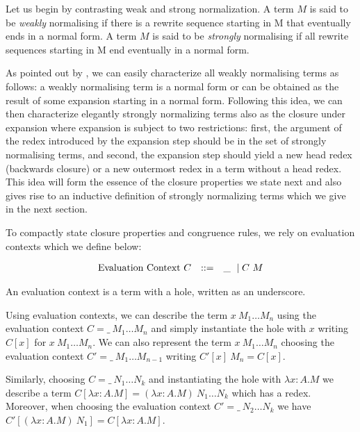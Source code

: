 \documentclass{article}
\begin{document}

Let us begin by contrasting weak and strong normalization. A term $M$ is said to be \emph{weakly} normalising if there is a  rewrite sequence starting in M that eventually ends in a  normal form. A  term $M$ is said to be \emph{strongly} normalising if all rewrite sequences starting in M end eventually in a  normal form.

As pointed out by \cite{Raamsdonk_onnormalisation}, we can easily characterize all weakly normalising terms as follows: a  weakly normalising term is a normal form or can be obtained as the result of some expansion starting in a  normal form. Following this idea, we can then characterize elegantly strongly normalizing terms also as the closure under expansion where expansion is subject to two restrictions: first, the argument of the redex introduced by the expansion step should be in the set of strongly normalising terms, and second, the expansion step should yield a new head redex (backwards closure) or a  new outermost redex in a  term without a  head redex. This idea will form the essence of the closure properties we state next and also gives rise to an inductive definition of strongly normalizing terms which we give in the next section.

To compactly state closure properties and congruence rules, we rely on evaluation contexts which we define below:

\[
\begin{array}{lcl}
\mbox{Evaluation Context}~C & \mathrel{::=} & {\_} ~\mid C~M
\end{array}
\]

An evaluation context is a term with a hole, written as an underscore.

Using evaluation contexts, we can describe the term $x~M_1 \ldots M_n$ using the evaluation context $C = \_~M_1 \ldots M_n$ and simply instantiate the hole with $x$ writing $C[x]$ for $x~M_1 \ldots M_n$. We can also represent the term $x~M_1 \ldots M_n$ choosing the evaluation context $C' = \_~M_1 \ldots M_{n-1}$ writing $C'[x]~M_n = C[x]$.

Similarly, choosing $C = \_ ~N_1 \ldots N_k$ and instantiating the hole with $\lambda x{:}A.M$ we describe a term $C[\lambda x{:}A.M] = (\lambda x{:}A.M)~N_1 \ldots N_k$ which has a redex. Moreover, when choosing the evaluation context $C' = \_~N_2 \ldots N_k$ we have $C'[(\lambda x{:}A.M)~N_1] = C[\lambda x{:}A.M]$.
\end{document}
